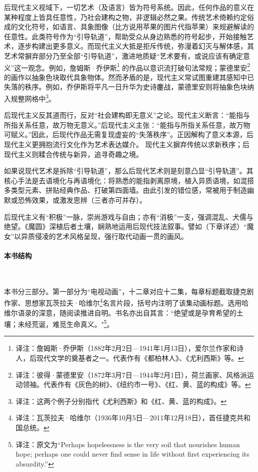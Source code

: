 后现代主义视域下，一切艺术（及语言）皆为符号系统。因此，任何作品的意义在某种程度上皆具任意性，乃社会建构之物，非逻辑必然之果。传统艺术倚赖约定俗成的文化符号，如语言、具象图像（比方说用苹果的图片代指苹果）来规避解读的任意性。此类符号作为“引导轨道”，帮助受众从身边熟悉的符号起步，开始接触艺术，逐步构建出更多意义。而现代主义大抵是拒斥传统，弥漫着幻灭与解体感，其艺术常摒弃部分乃至全部“引导轨道”，激进地质疑“艺术要有，或说应该有确定意义”这一观念。例如，詹姆斯·乔伊斯\footnote{译注：詹姆斯·乔伊斯（1882年2月2日—1941年1月13日），爱尔兰作家和诗人，后现代文学的奠基者之一。代表作有《都柏林人》、《尤利西斯》等。} 的作品以意识流打破句法常规；蒙德里安\footnote{译注：彼得·蒙德里安（1872年3月7日—1944年2月1日），荷兰画家、风格派运动领袖。代表作有《灰色的树》、《纽约市一号》、《红、黄、蓝的构成》等。}的画作以抽象色块取代具象物体。然而矛盾的是，现代主义常试图重建其感知中已失落的秩序\cite{ref3}。例如，乔伊斯将平凡一日升华为史诗鏖战，蒙德里安则将抽象色块纳入规整网格中\footnote{译注：这两个例子分别指代《尤利西斯》和《红、黄、蓝的构成》。}。

后现代主义反其道而行，反对“社会建构即无意义”之论。现代主义断言：“能指与所指关系任意，故万物无意义。”后现代主义主张：“能指与所指关系任意，故万物可赋义。”因此，后现代作品无需复现虚妄的“失落秩序”。正因解构了意义本源，后现代主义更拥抱流行文化作为艺术表达媒介\cite{ref4}。
现代主义摒弃传统以求新秩序；后现代主义则糅合传统与新异，追寻奇趣之境\cite{ref5}。

如果说现代艺术是拆除“引导轨道”，那么后现代艺术则是刻意凸显“引导轨道”。其核心手法是去语境化与再语境化：将熟悉的能指剥离原境，植入异质语境，如混搭多类型元素、拼贴经典作品、打破第四面墙\cite{ref5}。由此引发的错位感，常被用于制造幽默或恐怖效果，或激发思辨（三者亦可并存）。

后现代主义有“积极”一脉，崇尚游戏与自由；亦有“消极”一支，强调混乱、犬儒与绝望\cite{ref6}。《魔圆》深植后者土壤，娴熟地运用后现代技法叙事。譬如（下章详述）“魔女”以异质侵凌的艺术风格呈现，强行取代动画一贯的画风。
\paragraph{本书结构}~{}

本书分三部分。第一部分为“电视动画”，十二章对应十二集，每章标题截取捷克剧作家、思想家瓦茨拉夫·哈维尔\footnote{译注：瓦茨拉夫·哈维尔（1936年10月5日—2011年12月18日），首任捷克共和国总统。}名言片段，括号内注明了该集动画标题。选用哈维尔语录的深意，随阅读推进自明。书名亦出自其言：``绝望或是孕育希望的土壤；未经荒诞，难觅生命真义。"\footnote{译注：原文为``Perhaps hopelessness is the very soil that nourishes human hope; perhaps one could never find sense in life without first experiencing its absurdity.'' }\cite{ref7}。

